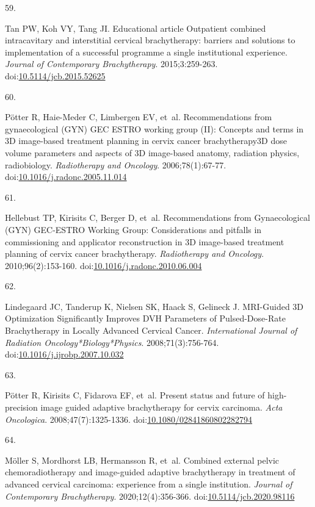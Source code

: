 \documentclass[
  a4paper,
]{scrreprt}
\newlength{\cslhangindent}
\newlength{\csllabelwidth}
\newlength{\cslentryspacingunit} %
\newenvironment{CSLReferences}[2] %
 {%
  \setlength{\parindent}{0pt}
  \ifodd #1
  \let\oldpar\par
  \def\par{\hangindent=\cslhangindent\oldpar}
  \fi
  \setlength{\parskip}{#2\cslentryspacingunit}
 }%
 {}
\newcommand{\CSLLeftMargin}[1]{\parbox[t]{\csllabelwidth}{#1}}
\newcommand{\CSLRightInline}[1]{\parbox[t]{\linewidth - \csllabelwidth}{#1}\break}
\begin{document}
\begin{CSLReferences}{0}{0}
\leavevmode{}%
\CSLLeftMargin{59. }%
\CSLRightInline{Tan PW, Koh VY, Tang JI. Educational article Outpatient
combined intracavitary and interstitial cervical brachytherapy: barriers
and solutions to implementation of a successful programme {\textendash}
a single institutional experience. \emph{Journal of Contemporary
Brachytherapy}. 2015;3:259-263.
doi:\href{https://doi.org/10.5114/jcb.2015.52625}{10.5114/jcb.2015.52625}}

\leavevmode{}%
\CSLLeftMargin{60. }%
\CSLRightInline{Pötter R, Haie-Meder C, Limbergen EV, et~al.
Recommendations from gynaecological (GYN) GEC ESTRO working group (II):
Concepts and terms in 3D image-based treatment planning in cervix cancer
brachytherapy{\textemdash}3D dose volume parameters and aspects of 3D
image-based anatomy, radiation physics, radiobiology. \emph{Radiotherapy
and Oncology}. 2006;78(1):67-77.
doi:\href{https://doi.org/10.1016/j.radonc.2005.11.014}{10.1016/j.radonc.2005.11.014}}

\leavevmode{}%
\CSLLeftMargin{61. }%
\CSLRightInline{Hellebust TP, Kirisits C, Berger D, et~al.
Recommendations from Gynaecological (GYN) GEC-ESTRO Working Group:
Considerations and pitfalls in commissioning and applicator
reconstruction in 3D image-based treatment planning of cervix cancer
brachytherapy. \emph{Radiotherapy and Oncology}. 2010;96(2):153-160.
doi:\href{https://doi.org/10.1016/j.radonc.2010.06.004}{10.1016/j.radonc.2010.06.004}}

\leavevmode{}%
\CSLLeftMargin{62. }%
\CSLRightInline{Lindegaard JC, Tanderup K, Nielsen SK, Haack S, Gelineck
J. MRI-Guided 3D Optimization Significantly Improves DVH Parameters of
Pulsed-Dose-Rate Brachytherapy in Locally Advanced Cervical Cancer.
\emph{International Journal of Radiation Oncology*Biology*Physics}.
2008;71(3):756-764.
doi:\href{https://doi.org/10.1016/j.ijrobp.2007.10.032}{10.1016/j.ijrobp.2007.10.032}}

\leavevmode{}%
\CSLLeftMargin{63. }%
\CSLRightInline{Pötter R, Kirisits C, Fidarova EF, et~al. Present status
and future of high-precision image guided adaptive brachytherapy for
cervix carcinoma. \emph{Acta Oncologica}. 2008;47(7):1325-1336.
doi:\href{https://doi.org/10.1080/02841860802282794}{10.1080/02841860802282794}}

\leavevmode{}%
\CSLLeftMargin{64. }%
\CSLRightInline{Möller S, Mordhorst LB, Hermansson R, et~al. Combined
external pelvic chemoradiotherapy and image-guided adaptive
brachytherapy in treatment of advanced cervical carcinoma: experience
from a single institution. \emph{Journal of Contemporary Brachytherapy}.
2020;12(4):356-366.
doi:\href{https://doi.org/10.5114/jcb.2020.98116}{10.5114/jcb.2020.98116}}


\end{CSLReferences}
\end{document}
